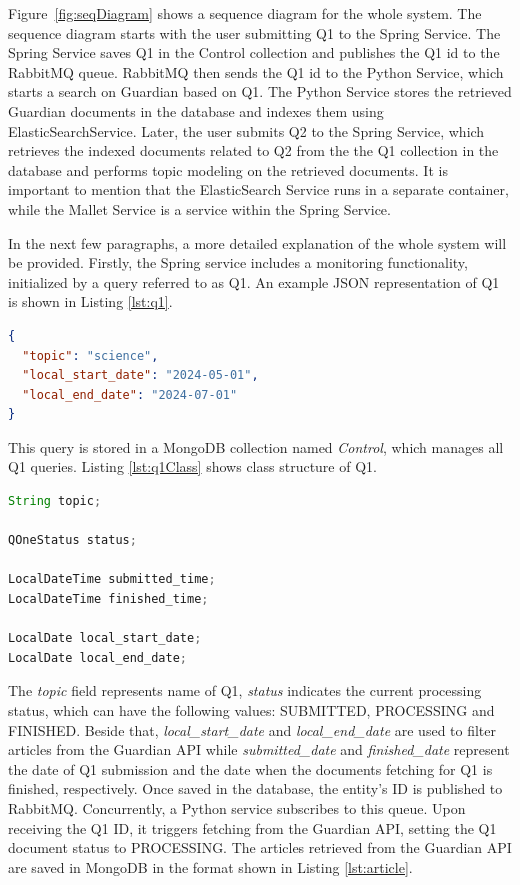 Figure~\ref{fig:seqDiagram} shows a sequence diagram for the whole system.
The sequence diagram starts with the user submitting Q1 to the Spring Service. The
Spring Service saves Q1 in the Control collection and publishes the Q1 id to the
RabbitMQ queue. RabbitMQ then sends the Q1 id to the Python Service, which starts a
search on Guardian based on Q1. The Python Service stores the retrieved Guardian
documents in the database and indexes them using ElasticSearchService. Later, the user
submits Q2 to the Spring Service, which retrieves the indexed documents related to Q2
from the the Q1 collection in the database and performs topic modeling on the retrieved
documents. It is important to mention that the ElasticSearch Service runs in a separate
container, while the Mallet Service is a service within the Spring Service.

In the next few paragraphs, a more detailed explanation of the whole system will be provided.
Firstly, the Spring service includes a monitoring functionality, initialized by a query referred to as Q1. An
example JSON representation of Q1 is shown in Listing \ref{lst:q1}.

\begin{lstlisting}[language=json, caption={JSON representation of Q1}, label={lst:q1}]
{
  "topic": "science",
  "local_start_date": "2024-05-01",
  "local_end_date": "2024-07-01"
}
\end{lstlisting}

This query is stored in a MongoDB collection named \textit{Control}, which manages all Q1 queries.
Listing \ref{lst:q1Class} shows class structure of Q1.

\begin{lstlisting}[language=Java, caption={Class definition of QOne}, label={lst:q1Class}]
String topic;

QOneStatus status;

LocalDateTime submitted_time;
LocalDateTime finished_time;

LocalDate local_start_date;
LocalDate local_end_date;
\end{lstlisting}

The \textit{topic} field represents name of Q1, \textit{status} indicates the current processing status, which can
have the following values: SUBMITTED, PROCESSING and FINISHED. Beside that, \textit{local\_start\_date} and
\textit{local\_end\_date} are used to filter articles from the Guardian API while \textit{submitted\_date} and
\textit{finished\_date} represent the date of Q1 submission and the date when the documents fetching for Q1 is finished,
respectively. Once saved in the database, the entity's ID is published to RabbitMQ.
\newline
Concurrently, a Python service subscribes to this queue. Upon receiving the Q1 ID, it triggers fetching from
the Guardian API, setting the Q1 document status to PROCESSING. The articles retrieved from the Guardian API are saved
in MongoDB in the format shown in Listing \ref{lst:article}.

